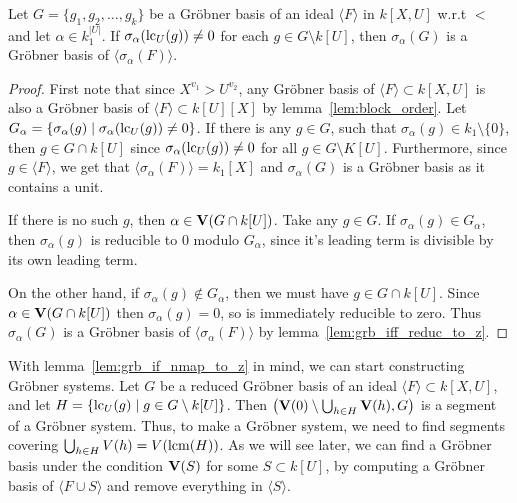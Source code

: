 \begin{lemma}\label{lem:grb_if_nmap_to_z}
  Let $G = \{g_{1}, g_{2}, \dots, g_{k}\}$ be a Gröbner basis of an ideal $\langle F \rangle$ in $k[X, U]$ w.r.t $<$ and let $\alpha \in k_{1}^{|U|}$. If $\sigma_{\alpha}(\operatorname{lc}_{U}(g)) \neq 0$ for each $g \in G \setminus k[U]$, then $\sigma_{\alpha}(G)$ is a Gröbner basis of $\langle \sigma_{\alpha}(F) \rangle$.
\end{lemma}
\begin{proof}
  First note that since $X^{v_{1}} > U^{v_{2}}$, any Gröbner basis of $\langle F \rangle \subset k[X, U]$ is also a Gröbner basis of $\langle F \rangle \subset k[U][X]$ by lemma~\ref{lem:block_order}. Let $G_{\alpha} = \{\sigma_{\alpha}(g) \mid \sigma_{\alpha}(\operatorname{lc}_{U}(g)) \neq 0\}$. If there is any $g \in G$, such that $\sigma_{\alpha}(g) \in k_{1} \setminus \{0\}$, then $g \in G \cap k[U]$ since $\sigma_{\alpha}(\operatorname{lc}_{U}(g)) \neq 0$ for all $g \in G \setminus K[U]$. Furthermore, since $g \in \langle F \rangle$, we get that $\langle \sigma_{\alpha}(F) \rangle = k_{1}[X]$ and $\sigma_{\alpha}(G)$ is a Gröbner basis as it contains a unit.

  If there is no such $g$, then $\alpha \in \operatorname{\mathbf V}(G \cap k[U])$. Take any $g \in G$. If $\sigma_{\alpha}(g) \in G_{\alpha}$, then $\sigma_{\alpha}(g)$ is reducible to $0$ modulo $G_{\alpha}$, since it's leading term is divisible by its own leading term.

  On the other hand, if $\sigma_{\alpha}(g) \notin G_{\alpha}$, then we must have $g \in G \cap k[U]$. Since $\alpha \in \operatorname{\mathbf V}(G \cap k[U])$ then $\sigma_{\alpha}(g) = 0$, so is immediately reducible to zero. Thus $\sigma_{\alpha}(G)$ is a Gröbner basis of $\langle \sigma_{\alpha}(F) \rangle$ by lemma~\ref{lem:grb_iff_reduc_to_z}.
\end{proof}

With lemma~\ref{lem:grb_if_nmap_to_z} in mind, we can start constructing Gröbner systems. Let $G$ be a reduced Gröbner basis of an ideal $\langle F \rangle \subset k[X, U]$, and let $H = \{\operatorname{lc}_{U}(g) \mid g \in G \setminus k[U]\}$. Then $\left(\operatorname{\mathbf V}(0) \setminus \bigcup_{h \in H} \operatorname{\mathbf V}(h), G\right)$ is a segment of a Gröbner system. Thus, to make a Gröbner system, we need to find segments covering $\bigcup_{h \in H} V(h) = V(\operatorname{lcm}(H))$. As we will see later, we can find a Gröbner basis under the condition $\operatorname{\mathbf V}(S)$ for some $S \subset k[U]$, by computing a Gröbner basis of $\langle F \cup S \rangle$ and remove everything in $\langle S \rangle$.

